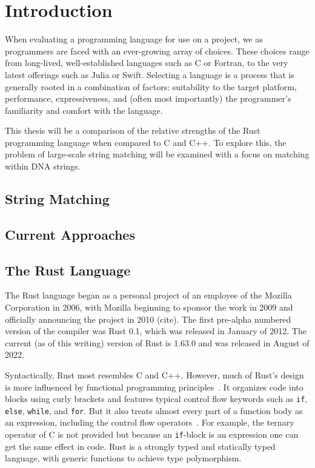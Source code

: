 \section{Introduction}
\label{sec:introduction}

When evaluating a programming language for use on a project, we as programmers are faced with an ever-growing array of choices. These choices range from long-lived, well-established languages such as C or Fortran, to the very latest offerings such as Julia or Swift. Selecting a language is a process that is generally rooted in a combination of factors: suitability to the target platform, performance, expressiveness, and (often most importantly) the programmer's familiarity and comfort with the language.

This thesis will be a comparison of the relative strengths of the Rust programming language when compared to C and C++. To explore this, the problem of large-scale string matching will be examined with a focus on matching within DNA strings.

\subsection{String Matching}



\subsection{Current Approaches}

\subsection{The Rust Language}

The Rust language began as a personal project of an employee of the Mozilla Corporation in 2006, with Mozilla beginning to sponsor the work in 2009 and officially announcing the project in 2010 (cite). The first pre-alpha numbered version of the compiler was Rust 0.1, which was released in January of 2012. The current (as of this writing) version of Rust is 1.63.0 and was released in August of 2022.

Syntactically, Rust most resembles C and C++. However, much of Rust's design is more influenced by functional programming principles~\cite[Chapter~13]{rpl.2019}. It organizes code into blocks using curly brackets and features typical control flow keywords such as \texttt{if}, \texttt{else}, \texttt{while}, and \texttt{for}. But it also treats almost every part of a function body as an expression, including the control flow operators~\cite[Chapter~6]{programming.rust.2021}. For example, the ternary operator of C is not provided but because an \texttt{if}-block is an expression one can get the same effect in code. Rust is a strongly typed and statically typed language, with generic functions to achieve type polymorphism.

